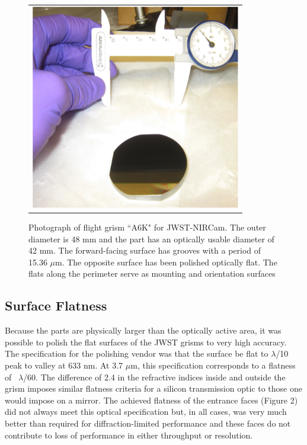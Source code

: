    \begin{figure}
   \begin{center}
   \begin{tabular}{c}
   \includegraphics[height=9cm]{chSPIE_2010_JWST/figs/A6K_scale.png}
   \end{tabular}
   \end{center}
   \caption[JWST grism [pictures] 
   { \label{fig:im1} 
Photograph of flight grism ``A6K" for JWST-NIRCam.  The outer diameter is 48 mm and the part has an optically usable diameter of 42 mm.  The forward-facing surface has grooves with a period of 15.36 $\mu$m.  The opposite surface has been polished optically flat.  The flats along the perimeter serve as mounting and orientation surfaces}
   \end{figure} 

\subsection{Surface Flatness}
Because the parts are physically larger than the optically active area, it was possible to polish the flat surfaces of the JWST grisms to very high accuracy.  The specification for the polishing vendor was that the surface be flat to $\lambda$/10 peak to valley at 633 nm.  At 3.7 $\mu$m, this specification corresponds to a flatness of ~$\lambda$/60.  The difference of 2.4 in the refractive indices inside and outside the grism imposes similar flatness criteria for a silicon transmission optic to those one would impose on a mirror.  The achieved flatness of the entrance faces (Figure 2) did not always meet this optical specification but, in all cases, was very much better than required for diffraction-limited performance and these faces do not contribute to loss of performance in either throughput or resolution.  


